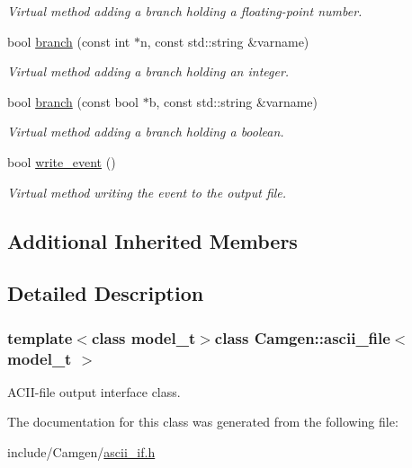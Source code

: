 \begin{DoxyCompactItemize}
\begin{DoxyCompactList}\small\item\em Virtual method adding a branch holding a floating-\/point number. \end{DoxyCompactList}\item 
\hypertarget{a00017_a56c0f4e40901571c0e01a50df6ec08c6}{}bool \hyperlink{a00017_a56c0f4e40901571c0e01a50df6ec08c6}{branch} (const int $\ast$n, const std\+::string \&varname)\label{a00017_a56c0f4e40901571c0e01a50df6ec08c6}

\begin{DoxyCompactList}\small\item\em Virtual method adding a branch holding an integer. \end{DoxyCompactList}\item 
\hypertarget{a00017_ad1e9cff1329e77c9fcbc3f584a654f06}{}bool \hyperlink{a00017_ad1e9cff1329e77c9fcbc3f584a654f06}{branch} (const bool $\ast$b, const std\+::string \&varname)\label{a00017_ad1e9cff1329e77c9fcbc3f584a654f06}

\begin{DoxyCompactList}\small\item\em Virtual method adding a branch holding a boolean. \end{DoxyCompactList}\item 
\hypertarget{a00017_a54212a1c88acb99828bc4187ae7f781c}{}bool \hyperlink{a00017_a54212a1c88acb99828bc4187ae7f781c}{write\+\_\+event} ()\label{a00017_a54212a1c88acb99828bc4187ae7f781c}

\begin{DoxyCompactList}\small\item\em Virtual method writing the event to the output file. \end{DoxyCompactList}\end{DoxyCompactItemize}
\subsection*{Additional Inherited Members}


\subsection{Detailed Description}
\subsubsection*{template$<$class model\+\_\+t$>$class Camgen\+::ascii\+\_\+file$<$ model\+\_\+t $>$}

A\+C\+I\+I-\/file output interface class. 

The documentation for this class was generated from the following file\+:\begin{DoxyCompactItemize}
\item 
include/\+Camgen/\hyperlink{a00602}{ascii\+\_\+if.\+h}\end{DoxyCompactItemize}
